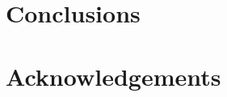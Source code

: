 \documentclass[preprint,12pt]{elsarticle}
\begin{document}

\newpage
\tableofcontents







\section{Conclusions}

\section*{Acknowledgements}

%





 







\end{document}
